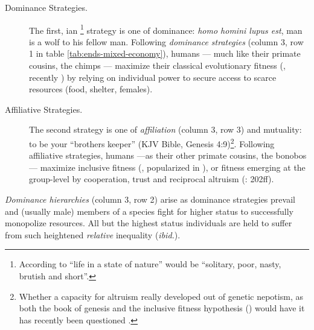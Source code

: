 \begin{description}
	\item[Dominance Strategies.] The first, \citeauthor{Hobbes-1651-aa}ian \citeyearpar{Hobbes-1651-aa}\footnote{
		According to \cite{Hobbes-1651-aa} ``life in a state of nature'' would be ``solitary, poor, nasty, brutish and short''.} 
	strategy is one of dominance: \emph{homo homini lupus est}, man is a wolf to his fellow man. Following \emph{dominance strategies} (column 3, row 1 in table \ref{tab:ends-mixed-economy}), humans --- much like their primate cousins, the chimps --- maximize their classical evolutionary fitness (\citealt{Darwin1859}, recently \citealt{Dawkins1976}) by relying on individual power to secure access to scarce resources (food, shelter, females).
	
	\item[Affiliative Strategies.] The second strategy is one of \emph{affiliation} (column 3, row 3) and mutuality: to be your ``brothers keeper'' (\gls{KJV} Bible, Genesis 4:9)\footnote{
		Whether a capacity for altruism really developed out of genetic nepotism, as both the book of genesis and the inclusive fitness hypothesis (\citealt{Hamilton1964,Wilson1975}) would have it has recently been questioned \citep{Wilson2012}.}. Following affiliative strategies, humans ---as their other primate cousins, the bonobos --- maximize inclusive fitness (\citealt{Hamilton1964}, popularized in \citealt{Wilson1975}), or fitness emerging at the group-level \citep{Wilson2012} by cooperation, trust and reciprocal altruism (\citealt{Pickett-2009-kx}: 202ff). 
\end{description}

\emph{Dominance hierarchies} (column 3, row 2) arise as dominance strategies prevail and (usually male) members of a species fight for higher status to successfully monopolize resources.  All but the highest status individuals are held to suffer from such heightened \emph{relative} inequality (\emph{ibid.}).

